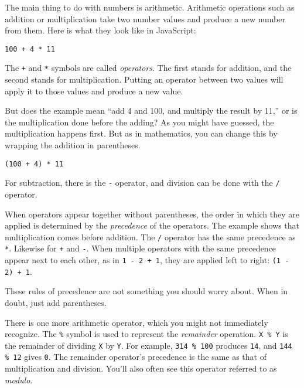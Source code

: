 The main thing to do with numbers is arithmetic. Arithmetic operations such as addition or multiplication take two number values and produce a new number from them. Here is what they look like in JavaScript:

\begin{lstlisting}
100 + 4 * 11
\end{lstlisting}
\noindent{}

The \lstinline`+` and \lstinline`*` symbols are called \emph{operators}. The first stands for addition, and the second stands for multiplication. Putting an operator between two values will apply it to those values and produce a new value.

But does the example mean ``add 4 and 100, and multiply the result by 11,'' or is the multiplication done before the adding? As you might have guessed, the multiplication happens first. But as in mathematics, you can change this by wrapping the addition in parentheses.

\begin{lstlisting}
(100 + 4) * 11
\end{lstlisting}
\noindent{}

For subtraction, there is the \lstinline`-` operator, and division can be done with the \lstinline`/` operator.

When operators appear together without parentheses, the order in which they are applied is determined by the \emph{precedence} of the operators. The example shows that multiplication comes before addition. The \lstinline`/` operator has the same precedence as \lstinline`*`. Likewise for \lstinline`+` and \lstinline`-`. When multiple operators with the same precedence appear next to each other, as in \lstinline`1 - 2 + 1`, they are applied left to right: \lstinline`(1 - 2) + 1`.

These rules of precedence are not something you should worry about. When in doubt, just add parentheses.

There is one more arithmetic operator, which you might not immediately recognize. The \lstinline`%` symbol is used to represent the \emph{remainder} operation. \lstinline`X % Y` is the remainder of dividing \lstinline`X` by \lstinline`Y`. For example, \lstinline`314 % 100` produces \lstinline`14`, and \lstinline`144 % 12` gives \lstinline`0`. The remainder operator's precedence is the same as that of multiplication and division. You'll also often see this operator referred to as \emph{modulo}.

